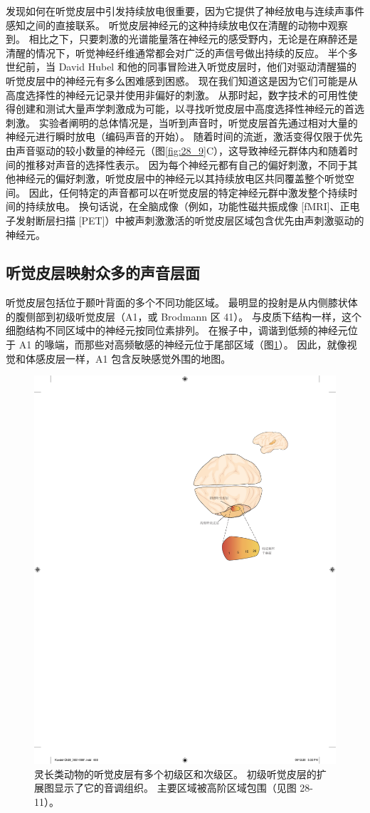 发现如何在听觉皮层中引发持续放电很重要，因为它提供了神经放电与连续声事件感知之间的直接联系。 
听觉皮层神经元的这种持续放电仅在清醒的动物中观察到。 
相比之下，只要刺激的光谱能量落在神经元的感受野内，无论是在麻醉还是清醒的情况下，听觉神经纤维通常都会对广泛的声信号做出持续的反应。 
半个多世纪前，当 David Hubel 和他的同事冒险进入听觉皮层时，他们对驱动清醒猫的听觉皮层中的神经元有多么困难感到困惑。 
现在我们知道这是因为它们可能是从高度选择性的神经元记录并使用非偏好的刺激。 
从那时起，数字技术的可用性使得创建和测试大量声学刺激成为可能，以寻找听觉皮层中高度选择性神经元的首选刺激。 
实验者阐明的总体情况是，当听到声音时，听觉皮层首先通过相对大量的神经元进行瞬时放电（编码声音的开始）。 
随着时间的流逝，激活变得仅限于优先由声音驱动的较小数量的神经元（图\ref{fig:28_9}C），这导致神经元群体内和随着时间的推移对声音的选择性表示。 
因为每个神经元都有自己的偏好刺激，不同于其他神经元的偏好刺激，听觉皮层中的神经元以其持续放电区共同覆盖整个听觉空间。 
因此，任何特定的声音都可以在听觉皮层的特定神经元群中激发整个持续时间的持续放电。 
换句话说，在全脑成像（例如，功能性磁共振成像 [fMRI]、正电子发射断层扫描 [PET]）中被声刺激激活的听觉皮层区域包含优先由声刺激驱动的神经元。


\subsection{听觉皮层映射众多的声音层面}
听觉皮层包括位于颞叶背面的多个不同功能区域。 
最明显的投射是从内侧膝状体的腹侧部到初级听觉皮层（A1，或 Brodmann 区 41）。 
与皮质下结构一样，这个细胞结构不同区域中的神经元按同位素排列。 
在猴子中，调谐到低频的神经元位于 A1 的喙端，而那些对高频敏感的神经元位于尾部区域（图\ref{fig:28_10}）。 
因此，就像视觉和体感皮层一样，A1 包含反映感觉外围的地图。

\begin{figure}[htbp]
	\centering
	\includegraphics[width=0.5\linewidth]{chap28/fig_28_10}
	\caption{灵长类动物的听觉皮层有多个初级区和次级区。 
		初级听觉皮层的扩展图显示了它的音调组织。 主要区域被高阶区域包围（见图 28-11）。}
	\label{fig:28_10}
\end{figure}


